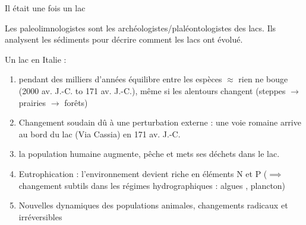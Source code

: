 \documentclass[11,aspectratio=1610]{beamer}
\begin{document}
\begin{frame}{Il était une fois un lac }



Les \alert{paleolimnologistes} sont les archéologistes/plaléontologistes des lacs. Ils analysent les sédiments pour décrire comment les lacs ont évolué.

\vfill

Un lac en Italie : 


\begin{footnotesize}
\begin{enumerate}
\item pendant des milliers d'années \alert{équilibre} entre les espèces $\approx$ rien ne bouge  (2000 av. J.-C. to 171 av. J.-C.), même si les alentours changent (steppes $\rightarrow$ prairies $\rightarrow$ forêts)
\item  \alert{Changement soudain} dû à une perturbation externe : une voie romaine arrive au bord du lac (Via Cassia) en 171 av. J.-C. 
\item la population humaine augmente, \alert{pêche} et mets ses \alert{déchets dans le lac}.
\item \alert{Eutrophication} : l'environnement devient riche en éléments N et  P ($\implies$ changement subtils dans les régimes hydrographiques :  algues , plancton)  
\item Nouvelles dynamiques des populations animales, \alert{changements radicaux et irréversibles}
\end{enumerate}
\end{footnotesize}
\end{frame}
\end{document}
